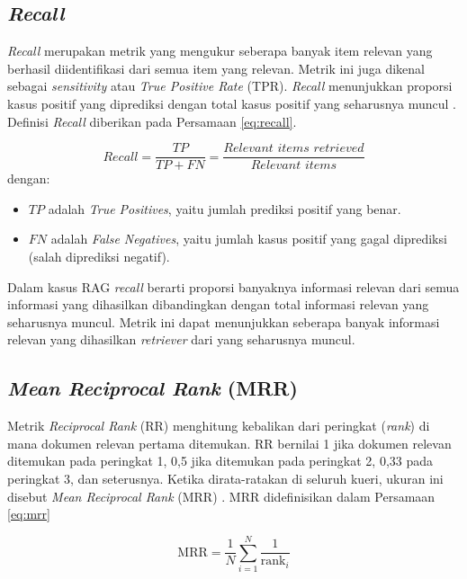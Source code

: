 \subsection{\textit{Recall}}

\textit{Recall} merupakan metrik yang mengukur seberapa banyak item relevan yang berhasil diidentifikasi dari semua item yang relevan.
Metrik ini juga dikenal sebagai \textit{sensitivity} atau \textit{True Positive Rate} (TPR).
\textit{Recall} menunjukkan proporsi kasus positif yang diprediksi dengan total kasus positif yang seharusnya muncul \cite{powers2020evaluationprecisionrecallfmeasure}.
Definisi \textit{Recall} diberikan pada Persamaan \ref{eq:recall}.

\begin{equation}
	\label{eq:recall}
	Recall = \frac{TP}{TP + FN} = \frac{\textit{Relevant items retrieved}}{\textit{Relevant items}}
\end{equation}%
dengan:
\begin{itemize}
	\item $TP$ adalah \textit{True Positives}, yaitu jumlah prediksi positif yang benar.
	\item $FN$ adalah \textit{False Negatives}, yaitu jumlah kasus positif yang gagal diprediksi (salah diprediksi negatif).
\end{itemize}

Dalam kasus RAG \textit{recall} berarti proporsi banyaknya informasi relevan dari semua informasi yang dihasilkan dibandingkan dengan total informasi relevan yang seharusnya muncul.
Metrik ini dapat menunjukkan seberapa banyak informasi relevan yang dihasilkan \textit{retriever} dari yang seharusnya muncul.

\subsection{\textit{Mean Reciprocal Rank} (MRR)}
Metrik \textit{Reciprocal Rank} (RR) menghitung kebalikan dari peringkat (\textit{rank}) di mana dokumen relevan pertama ditemukan.
RR bernilai 1 jika dokumen relevan ditemukan pada peringkat 1,  0,5 jika ditemukan pada peringkat 2,  0,33 pada peringkat 3, dan seterusnya.
Ketika dirata-ratakan di seluruh kueri, ukuran ini disebut \textit{Mean Reciprocal Rank} (MRR) \cite{craswell2016meanMRR}.
MRR didefinisikan dalam Persamaan \ref{eq:mrr}

\begin{equation}
	\label{eq:mrr}
	\mathrm{MRR} = \frac{1}{N} \sum_{i=1}^{N} \frac{1}{\text{rank}_i}
\end{equation}

